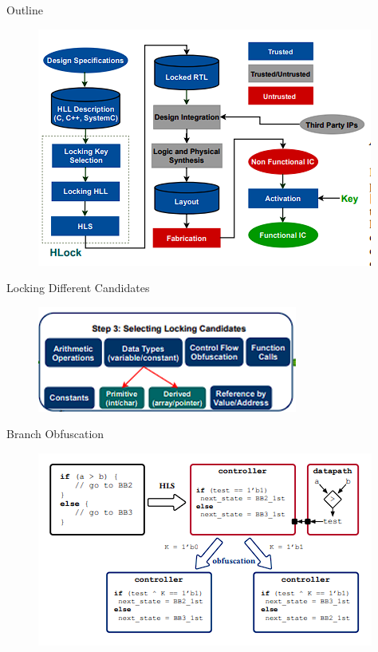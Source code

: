 \documentclass[xcolor=dvipsnames]{beamer}
\begin{document}
    \begin{frame}{Outline}

        \begin{figure}
            \includegraphics{HLockOverview.PNG}
        \end{figure}
        
    \end{frame}

    \begin{frame}{Locking Different Candidates}

        \begin{figure}
            \includegraphics{LockingCandidates.PNG}
        \end{figure}
        
    \end{frame}

    \begin{frame}{Branch Obfuscation}

        \begin{figure}
            \includegraphics{BranchObfuscation.PNG}
        \end{figure}
        
    \end{frame}
\end{document}

